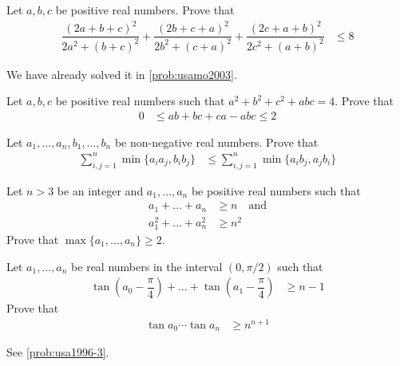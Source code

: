 \documentclass{subfile}
\begin{document}
		\begin{problem}
			Let $a,b,c$ be positive real numbers. Prove that
				\begin{align*}
					\dfrac{(2a+b+c)^{2}}{2a^{2}+(b+c)^{2}}+\dfrac{(2b+c+a)^{2}}{2b^{2}+(c+a)^{2}}+\dfrac{(2c+a+b)^{2}}{2c^{2}+(a+b)^{2}}
						& \leq 8
				\end{align*}

				\begin{solution}
					We have already solved it in \autoref{prob:usamo2003}.
				\end{solution}
		\end{problem}

		\begin{problem}
			Let $a,b,c$ be positive real numbers such that $a^{2}+b^{2}+c^{2}+abc=4$. Prove that
				\begin{align*}
					0
						& \leq ab+bc+ca-abc\leq 2
				\end{align*}
		\end{problem}

		\begin{problem}
			Let $a_{1},\ldots,a_{n},b_{1},\ldots,b_{n}$ be non-negative real numbers. Prove that
				\begin{align*}
					\sum_{i,j=1}^{n}\min\{a_{i}a_{j},b_{i}b_{j}\}
						& \leq\sum_{i,j=1}^{n}\min\{a_{i}b_{j},a_{j}b_{i}\}
				\end{align*}
		\end{problem}

		\begin{problem}
			Let $n>3$ be an integer and $a_{1},\ldots,a_{n}$ be positive real numbers such that
				\begin{align*}
					a_{1}+\ldots+a_{n}
						& \geq n\quad\mbox{and}\\
					a_{1}^{2}+\ldots+a_{n}^{2}
						& \geq n^{2}
				\end{align*}
			Prove that $\max\{a_{1},\ldots,a_{n}\}\geq2$.
		\end{problem}

		\begin{problem}
			Let $a_{1},\ldots,a_{n}$ be real numbers in the interval $(0,\pi/2)$ such that
				\begin{align*}
					\tan\left(a_{0}-\dfrac{\pi}{4}\right)+\ldots+\tan\left(a_{1}-\dfrac{\pi}{4}\right)
						& \geq n-1
				\end{align*}
			Prove that
				\begin{align*}
					\tan{a_{0}}\cdots\tan{a_{n}}
						& \geq n^{n+1}
				\end{align*}

				\begin{solution}
					See \eqref{prob:usa1996-3}.
				\end{solution}
		\end{problem}
\end{document}

